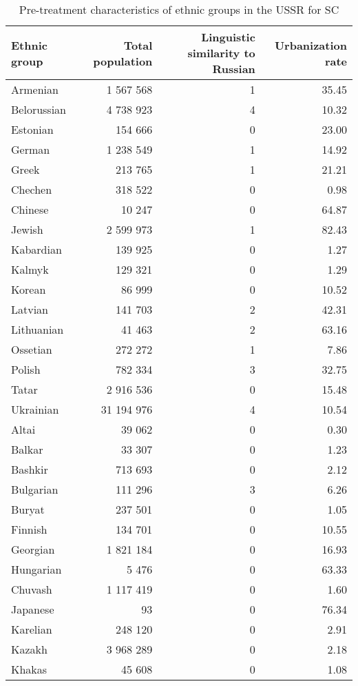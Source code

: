 \begin{table}[t]

\caption{\label{tab:}Pre-treatment characteristics of ethnic groups in the USSR for SC}
\centering
\begin{threeparttable}
\begin{tabular}{lrrr}
\toprule
Ethnic group & Total population & Linguistic similarity to Russian & Urbanization rate\\
\midrule
Armenian & 1 567 568 & 1 & 35.45\\
Belorussian & 4 738 923 & 4 & 10.32\\
Estonian & 154 666 & 0 & 23.00\\
German & 1 238 549 & 1 & 14.92\\
Greek & 213 765 & 1 & 21.21\\
Chechen & 318 522 & 0 & 0.98\\
Chinese & 10 247 & 0 & 64.87\\
Jewish & 2 599 973 & 1 & 82.43\\
Kabardian & 139 925 & 0 & 1.27\\
Kalmyk & 129 321 & 0 & 1.29\\
Korean & 86 999 & 0 & 10.52\\
Latvian & 141 703 & 2 & 42.31\\
Lithuanian & 41 463 & 2 & 63.16\\
Ossetian & 272 272 & 1 & 7.86\\
Polish & 782 334 & 3 & 32.75\\
Tatar & 2 916 536 & 0 & 15.48\\
Ukrainian & 31 194 976 & 4 & 10.54\\
Altai & 39 062 & 0 & 0.30\\
Balkar & 33 307 & 0 & 1.23\\
Bashkir & 713 693 & 0 & 2.12\\
Bulgarian & 111 296 & 3 & 6.26\\
Buryat & 237 501 & 0 & 1.05\\
Finnish & 134 701 & 0 & 10.55\\
Georgian & 1 821 184 & 0 & 16.93\\
Hungarian & 5 476 & 0 & 63.33\\
Chuvash & 1 117 419 & 0 & 1.60\\
Japanese & 93 & 0 & 76.34\\
Karelian & 248 120 & 0 & 2.91\\
Kazakh & 3 968 289 & 0 & 2.18\\
Khakas & 45 608 & 0 & 1.08\\

\end{tabular}
\end{threeparttable}
\end{table}
